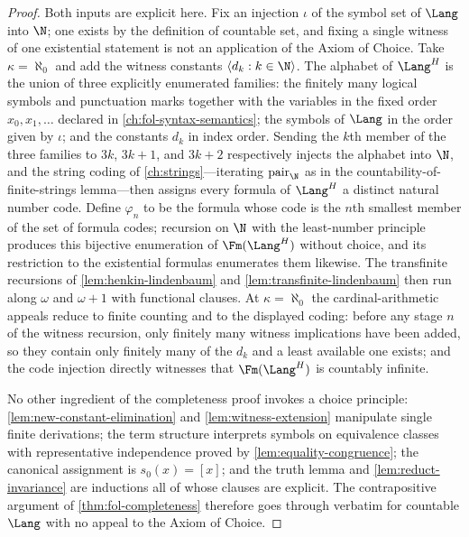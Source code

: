 \begin{proof}
Both inputs are explicit here.  Fix an injection \(\iota\) of the symbol
set of \(\Lang\) into \(\N\); one exists by the definition of countable
set, and fixing a single witness of one existential statement is not an
application of the Axiom of Choice.  Take \(\kappa=\aleph_0\) and add the
witness constants \(\langle d_k:k\in\N\rangle\).  The alphabet of
\(\Lang^H\) is the union of three explicitly enumerated families: the
finitely many logical symbols and punctuation marks together with the
variables in the fixed order \(x_0,x_1,\ldots\) declared in
\cref{ch:fol-syntax-semantics}; the symbols of \(\Lang\) in the order
given by \(\iota\); and the constants \(d_k\) in index order.  Sending
the \(k\)th member of the three families to \(3k\), \(3k+1\), and
\(3k+2\) respectively injects the alphabet into \(\N\), and the string
coding of \cref{ch:strings}---iterating \(\operatorname{pair}_{\N}\) as
in the countability-of-finite-strings lemma---then assigns every formula
of \(\Lang^H\) a distinct natural number code.  Define \(\varphi_n\) to
be the formula whose code is the \(n\)th smallest member of the set of
formula codes; recursion on \(\N\) with the least-number principle
produces this bijective enumeration of \(\Fm(\Lang^H)\) without choice,
and its restriction to the existential formulas enumerates them likewise.
The transfinite recursions of \cref{lem:henkin-lindenbaum} and
\cref{lem:transfinite-lindenbaum} then run along \(\omega\) and
\(\omega+1\) with functional clauses.  At \(\kappa=\aleph_0\) the
cardinal-arithmetic appeals reduce to finite counting and to the displayed
coding: before any stage \(n\) of the witness recursion, only finitely
many witness implications have been added, so they contain only finitely
many of the \(d_k\) and a least available one exists; and the code
injection directly witnesses that \(\Fm(\Lang^H)\) is countably
infinite.

No other ingredient of the completeness proof invokes a choice principle:
\cref{lem:new-constant-elimination} and
\cref{lem:witness-extension} manipulate single finite derivations; the
term structure interprets symbols on equivalence classes with
representative independence proved by
\cref{lem:equality-congruence}; the canonical assignment is
\(s_0(x)=[x]\); and the truth lemma and
\cref{lem:reduct-invariance} are inductions all of whose clauses are
explicit.  The
contrapositive argument of \cref{thm:fol-completeness} therefore goes
through verbatim for countable \(\Lang\) with no appeal to the Axiom of
Choice.
\end{proof}

